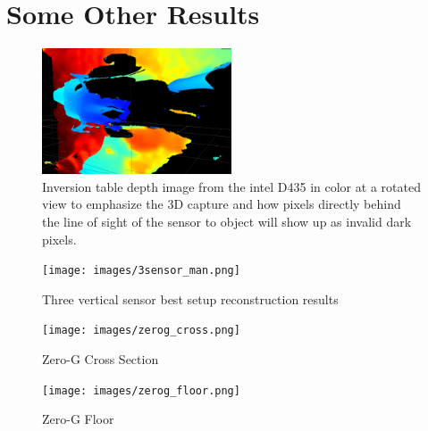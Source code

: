 
\chapter{Some Other Results}

\begin{figure}[h]
        \caption{Inversion table depth image from the intel D435 in color at a rotated view to emphasize the 3D capture and how pixels directly behind the line of sight of the sensor to object will show up as invalid dark pixels.}
        \centering
        \includegraphics[width=0.5\textwidth]{images/inversion_depth.png}
\end{figure}

\begin{figure}[h]
        \caption{Three vertical sensor best setup reconstruction results}
        \centering
        \texttt{[image: images/3sensor\_man.png]}
\end{figure}


\begin{figure}[h]
        \caption{Zero-G Cross Section}
        \centering
        \texttt{[image: images/zerog\_cross.png]}
\end{figure}

\begin{figure}[h]
        \caption{Zero-G Floor}
        \centering
        \texttt{[image: images/zerog\_floor.png]}
\end{figure}


